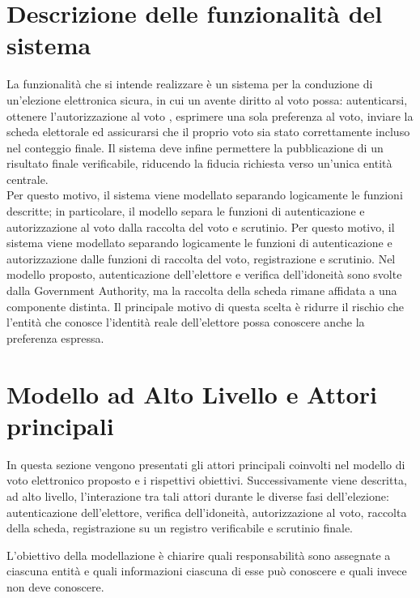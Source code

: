 \documentclass[a4paper,12pt]{article}
\begin{document}
\section{Descrizione delle funzionalità del sistema}
    La funzionalità che si intende realizzare è un sistema per la conduzione di un'elezione elettronica sicura,
    in cui un avente diritto al voto possa: autenticarsi, ottenere l'autorizzazione al voto ,
    esprimere una sola preferenza al voto, inviare la scheda elettorale ed assicurarsi che il proprio voto
    sia stato correttamente incluso nel conteggio finale. Il sistema deve infine permettere la pubblicazione di un risultato finale verificabile,
    riducendo la fiducia richiesta verso un'unica entità centrale.\\
    Per questo motivo, il sistema viene modellato separando logicamente le funzioni
    descritte; in particolare, il modello separa le funzioni di autenticazione e autorizzazione al voto dalla raccolta del voto e scrutinio. Per questo motivo, il sistema viene modellato separando logicamente le funzioni
    di autenticazione e autorizzazione dalle funzioni di raccolta del voto, registrazione
    e scrutinio. Nel modello proposto, autenticazione dell'elettore e verifica
    dell'idoneità sono svolte dalla Government Authority, ma la raccolta della scheda
    rimane affidata a una componente distinta. Il principale motivo di questa scelta è
    ridurre il rischio che l'entità che conosce l'identità reale dell'elettore possa
    conoscere anche la preferenza espressa.
\section{Modello ad Alto Livello e Attori principali}

In questa sezione vengono presentati gli attori principali coinvolti nel modello di voto elettronico proposto e i rispettivi obiettivi. 
Successivamente viene descritta, ad alto livello, l'interazione tra tali attori durante le diverse fasi dell'elezione: 
autenticazione dell'elettore, verifica dell'idoneità, autorizzazione al voto, raccolta della scheda, registrazione su un registro verificabile e scrutinio finale.

L'obiettivo della modellazione è chiarire quali responsabilità sono assegnate a ciascuna entità e quali informazioni ciascuna di esse può conoscere e quali invece non deve conoscere.
\end{document}
